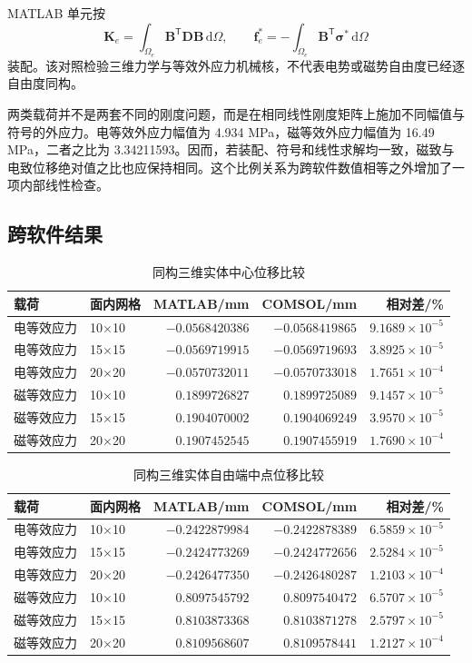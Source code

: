 \documentclass[UTF8,fontset=windows,11pt,a4paper]{ctexart}
\begin{document}
MATLAB 单元按
\[
\mathbf K_e=\int_{\Omega_e}\mathbf B^{\mathsf T}\mathbf D\mathbf B\,\mathrm d\Omega,
\qquad
\mathbf f_e^{*}=-\int_{\Omega_e}\mathbf B^{\mathsf T}\boldsymbol\sigma^{*}\,\mathrm d\Omega
\]
装配。该对照检验三维力学与等效外应力机械核，不代表电势或磁势自由度已经逐自由度同构。

两类载荷并不是两套不同的刚度问题，而是在相同线性刚度矩阵上施加不同幅值与符号的外应力。电等效外应力幅值为 4.934 MPa，磁等效外应力幅值为 16.49 MPa，二者之比为 3.34211593。因而，若装配、符号和线性求解均一致，磁致与电致位移绝对值之比也应保持相同。这个比例关系为跨软件数值相等之外增加了一项内部线性检查。

\subsection{跨软件结果}

\begin{table}[H]
\centering
\caption{同构三维实体中心位移比较}
\label{tab:iso_center}
\small
\begin{tabular}{llrrr}
\toprule
载荷 & 面内网格 & MATLAB/mm & COMSOL/mm & 相对差/\% \\
\midrule
电等效应力 & 10$\times$10 & $-0.0568420386$ & $-0.0568419865$ & $9.1689\times10^{-5}$ \\
电等效应力 & 15$\times$15 & $-0.0569719915$ & $-0.0569719693$ & $3.8925\times10^{-5}$ \\
电等效应力 & 20$\times$20 & $-0.0570732011$ & $-0.0570733018$ & $1.7651\times10^{-4}$ \\
磁等效应力 & 10$\times$10 & $0.1899726827$ & $0.1899725089$ & $9.1457\times10^{-5}$ \\
磁等效应力 & 15$\times$15 & $0.1904070002$ & $0.1904069249$ & $3.9570\times10^{-5}$ \\
磁等效应力 & 20$\times$20 & $0.1907452545$ & $0.1907455919$ & $1.7690\times10^{-4}$ \\
\bottomrule
\end{tabular}
\end{table}

\begin{table}[H]
\centering
\caption{同构三维实体自由端中点位移比较}
\label{tab:iso_free_mid}
\small
\begin{tabular}{llrrr}
\toprule
载荷 & 面内网格 & MATLAB/mm & COMSOL/mm & 相对差/\% \\
\midrule
电等效应力 & 10$\times$10 & $-0.2422879984$ & $-0.2422878389$ & $6.5859\times10^{-5}$ \\
电等效应力 & 15$\times$15 & $-0.2424773269$ & $-0.2424772656$ & $2.5284\times10^{-5}$ \\
电等效应力 & 20$\times$20 & $-0.2426477350$ & $-0.2426480287$ & $1.2103\times10^{-4}$ \\
磁等效应力 & 10$\times$10 & $0.8097545792$ & $0.8097540472$ & $6.5707\times10^{-5}$ \\
磁等效应力 & 15$\times$15 & $0.8103873368$ & $0.8103871278$ & $2.5797\times10^{-5}$ \\
磁等效应力 & 20$\times$20 & $0.8109568607$ & $0.8109578441$ & $1.2127\times10^{-4}$ \\
\bottomrule
\end{tabular}
\end{table}
\end{document}
